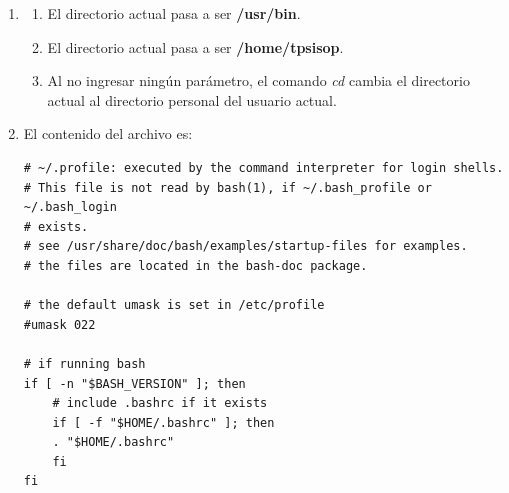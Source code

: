 \documentclass[a4paper,11pt] {article}
\begin{document}
\begin{enumerate}
	\item \begin{enumerate}
		\item El directorio actual pasa a ser \textbf{/usr/bin}.
		\item El directorio actual pasa a ser \textbf{/home/tpsisop}.
		\item Al no ingresar ningún parámetro, el comando \textit{cd} cambia el directorio actual al directorio personal del usuario actual.
	\end{enumerate}
	\item El contenido del archivo es:
	\begin{verbatim}
# ~/.profile: executed by the command interpreter for login shells.
# This file is not read by bash(1), if ~/.bash_profile or ~/.bash_login
# exists.
# see /usr/share/doc/bash/examples/startup-files for examples.
# the files are located in the bash-doc package.

# the default umask is set in /etc/profile
#umask 022

# if running bash
if [ -n "$BASH_VERSION" ]; then
    # include .bashrc if it exists
    if [ -f "$HOME/.bashrc" ]; then
	. "$HOME/.bashrc"
    fi
fi


\end{verbatim}
\end{enumerate}
\end{document}
